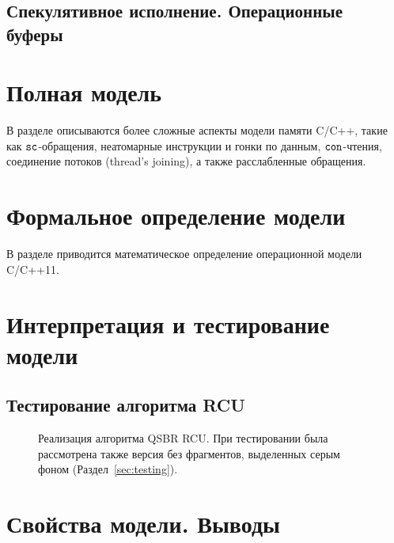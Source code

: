 \subsection{Спекулятивное исполнение. Операционные буферы}

\section{Полная модель}
В разделе описываются более сложные аспекты модели памяти C/C++, такие как
${\mathtt{sc}}$-обращения, неатомарные инструкции и гонки по данным,
${\mathtt{con}}$-чтения, соединение потоков (thread's joining),
а также расслабленные обращения.

\section{Формальное определение модели}
В разделе приводится математическое определение операционной модели C/C++11.

\section{Интерпретация и тестирование модели}

\subsection{Тестирование алгоритма RCU}



\begin{figure*}[t]

\caption[Реализация алгоритма QSBR RCU]
{Реализация алгоритма QSBR RCU.
 При тестировании была рассмотрена также версия без фрагментов, выделенных серым фоном
 (Раздел~\ref{sec:testing}).}
\label{fig:rcuProg}
\end{figure*}

\section{Свойства модели. Выводы}

